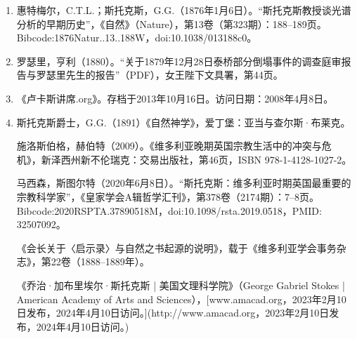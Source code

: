 \begin{enumerate}
\item 惠特梅尔，C.T.L.；斯托克斯，G.G.（1876年1月6日）。“斯托克斯教授谈光谱分析的早期历史”，《自然》（Nature），第13卷（第323期）：188–189页。Bibcode:1876Natur..13..188W，doi:10.1038/013188c0。

\item 罗瑟里，亨利（1880）。“关于1879年12月28日泰桥部分倒塌事件的调查庭审报告与罗瑟里先生的报告”（PDF），女王陛下文具署，第44页。

\item 《卢卡斯讲席.org》。存档于2013年10月16日。访问日期：2008年4月8日。

\item 斯托克斯爵士，G.G.（1891）《自然神学》，爱丁堡：亚当与查尔斯·布莱克。

施洛斯伯格，赫伯特（2009）。《维多利亚晚期英国宗教生活中的冲突与危机》，新泽西州新不伦瑞克：交易出版社，第46页，ISBN 978-1-4128-1027-2。

马西森，斯图尔特（2020年6月8日）。“斯托克斯：维多利亚时期英国最重要的宗教科学家”，《皇家学会A辑哲学汇刊》，第378卷（2174期）：7–8页。Bibcode:2020RSPTA.37890518M，doi:10.1098/rsta.2019.0518，PMID: 32507092。

《会长关于〈启示录〉与自然之书起源的说明》，载于《维多利亚学会事务杂志》，第22卷（1888–1889年）。

《乔治·加布里埃尔·斯托克斯 | 美国文理科学院》（George Gabriel Stokes | American Academy of Arts and Sciences），[www.amacad.org，2023年2月10日发布，2024年4月10日访问。](http://www.amacad.org，2023年2月10日发布，2024年4月10日访问。)

\end{enumerate}